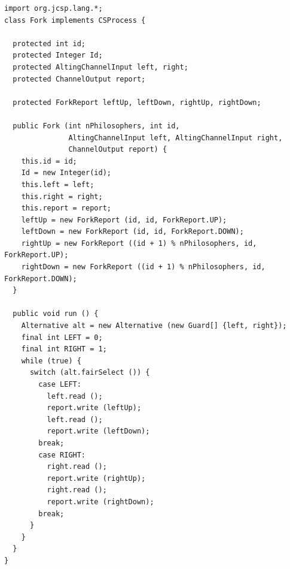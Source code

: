 \documentclass[a4paper,11pt,french]{report}
\begin{document}
\begin{lstlisting}[frame=trBL,title={Dîner des philosophes : Fork.java}]
import org.jcsp.lang.*;
class Fork implements CSProcess {

  protected int id;
  protected Integer Id;
  protected AltingChannelInput left, right;
  protected ChannelOutput report;

  protected ForkReport leftUp, leftDown, rightUp, rightDown;

  public Fork (int nPhilosophers, int id,
               AltingChannelInput left, AltingChannelInput right,
               ChannelOutput report) {
    this.id = id;
    Id = new Integer(id);
    this.left = left;
    this.right = right;
    this.report = report;
    leftUp = new ForkReport (id, id, ForkReport.UP);
    leftDown = new ForkReport (id, id, ForkReport.DOWN);
    rightUp = new ForkReport ((id + 1) % nPhilosophers, id, ForkReport.UP);
    rightDown = new ForkReport ((id + 1) % nPhilosophers, id, ForkReport.DOWN);
  }

  public void run () {
    Alternative alt = new Alternative (new Guard[] {left, right});
    final int LEFT = 0;
    final int RIGHT = 1;
    while (true) {
      switch (alt.fairSelect ()) {
        case LEFT:
          left.read ();
          report.write (leftUp);
          left.read ();
          report.write (leftDown);
        break;
        case RIGHT:
          right.read ();
          report.write (rightUp);
          right.read ();
          report.write (rightDown);
        break;
      }
    }
  }
}
\end{lstlisting}
\end{document}
